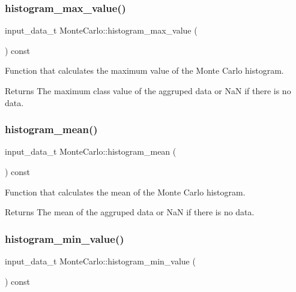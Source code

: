 \subsubsection{\texorpdfstring{histogram\+\_\+max\+\_\+value()}{histogram\_max\_value()}}
{\footnotesize\ttfamily input\+\_\+data\+\_\+t Monte\+Carlo\+::histogram\+\_\+max\+\_\+value (\begin{DoxyParamCaption}{ }\end{DoxyParamCaption}) const}

Function that calculates the maximum value of the Monte Carlo histogram. \begin{DoxyReturn}{Returns}
The maximum class value of the aggruped data or NaN if there is no data. 
\end{DoxyReturn}
\mbox{\label{classMonteCarlo_a0eec2f41498ce1c18d70967a1ce90c29}} 
\subsubsection{\texorpdfstring{histogram\+\_\+mean()}{histogram\_mean()}}
{\footnotesize\ttfamily input\+\_\+data\+\_\+t Monte\+Carlo\+::histogram\+\_\+mean (\begin{DoxyParamCaption}{ }\end{DoxyParamCaption}) const}

Function that calculates the mean of the Monte Carlo histogram. \begin{DoxyReturn}{Returns}
The mean of the aggruped data or NaN if there is no data. 
\end{DoxyReturn}
\mbox{\label{classMonteCarlo_a49567ab1184a37aa847566728384bd57}} 
\subsubsection{\texorpdfstring{histogram\+\_\+min\+\_\+value()}{histogram\_min\_value()}}
{\footnotesize\ttfamily input\+\_\+data\+\_\+t Monte\+Carlo\+::histogram\+\_\+min\+\_\+value (\begin{DoxyParamCaption}{ }\end{DoxyParamCaption}) const}

